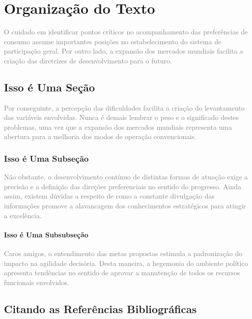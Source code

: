 \chapter{Organização do Texto}
\label{cap:Organizacao_do_Texto}

\textcolor{gray}{O cuidado em identificar pontos críticos no acompanhamento
das preferências de consumo assume importantes posições no estabelecimento
do sistema de participação geral. Por outro lado, a expansão dos mercados
mundiais facilita a criação das diretrizes de desenvolvimento para o futuro.}

\section{Isso é Uma Seção}
\label{sec:Isso_e_Uma_Secao}

\textcolor{gray}{Por conseguinte, a percepção das dificuldades facilita a
criação do levantamento das variáveis envolvidas. Nunca é demais lembrar
o peso e o significado destes problemas, uma vez que a expansão dos mercados
mundiais representa uma abertura para a melhoria dos modos de operação
convencionais.}

\subsection{Isso é Uma Subseção}
\label{sec:Isso_e_Uma_Subsecao}

\textcolor{gray}{Não obstante, o desenvolvimento contínuo de distintas formas
de atuação exige a precisão e a definição das direções preferenciais no sentido
do progresso. Ainda assim, existem dúvidas a respeito de como a constante
divulgação das informações promove a alavancagem dos conhecimentos estratégicos
para atingir a excelência.}

\subsubsection{Isso é Uma Subsubseção}
\label{sub:Isso_e_Uma_Subsubsecao}

\textcolor{gray}{Caros amigos, o entendimento das metas propostas estimula
a padronização do impacto na agilidade decisória. Desta maneira, a hegemonia
do ambiente político apresenta tendências no sentido de aprovar a manutenção
de todos os recursos funcionais envolvidos.}

\section{Citando as Referências Bibliográficas}
\label{sec:Citando_as_Referencias_Bibliograficas}

